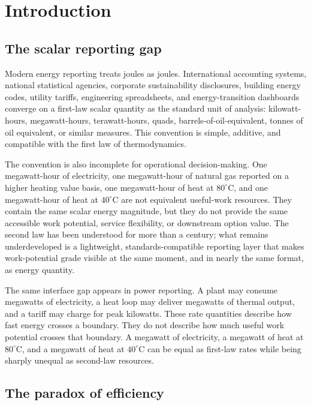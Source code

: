 \documentclass[11pt]{article}
\newcommand{\degC}{^{\circ}\mathrm{C}}
\begin{document}
\section{Introduction}

\subsection*{The scalar reporting gap}

Modern energy reporting treats joules as joules. International accounting systems, national statistical agencies, corporate sustainability disclosures, building energy codes, utility tariffs, engineering spreadsheets, and energy-transition dashboards converge on a first-law scalar quantity as the standard unit of analysis: kilowatt-hours, megawatt-hours, terawatt-hours, quads, barrels-of-oil-equivalent, tonnes of oil equivalent, or similar measures. This convention is simple, additive, and compatible with the first law of thermodynamics.

The convention is also incomplete for operational decision-making. One megawatt-hour of electricity, one megawatt-hour of natural gas reported on a higher heating value basis, one megawatt-hour of heat at $80\degC$, and one megawatt-hour of heat at $40\degC$ are not equivalent useful-work resources. They contain the same scalar energy magnitude, but they do not provide the same accessible work potential, service flexibility, or downstream option value. The second law has been understood for more than a century; what remains underdeveloped is a lightweight, standards-compatible reporting layer that makes work-potential grade visible at the same moment, and in nearly the same format, as energy quantity.

The same interface gap appears in power reporting. A plant may consume megawatts of electricity, a heat loop may deliver megawatts of thermal output, and a tariff may charge for peak kilowatts. These rate quantities describe how fast energy crosses a boundary. They do not describe how much useful work potential crosses that boundary. A megawatt of electricity, a megawatt of heat at $80\degC$, and a megawatt of heat at $40\degC$ can be equal as first-law rates while being sharply unequal as second-law resources.

\subsection*{The paradox of efficiency}
\end{document}

